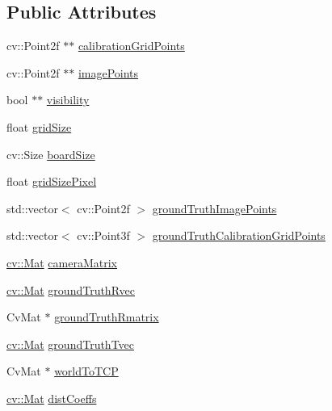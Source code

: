 \subsection*{Public Attributes}
\begin{DoxyCompactItemize}
\item 
cv\+::\+Point2f $\ast$$\ast$ \hyperlink{classsvl_c_c_calibration_grid_a16c87e7174d1ebadad02bb2f00374f20}{calibration\+Grid\+Points}
\item 
cv\+::\+Point2f $\ast$$\ast$ \hyperlink{classsvl_c_c_calibration_grid_af7379a6c73a59f86c73d299137455ac5}{image\+Points}
\item 
bool $\ast$$\ast$ \hyperlink{classsvl_c_c_calibration_grid_a7022b0856e07b5004a767fdd80d78e4a}{visibility}
\item 
float \hyperlink{classsvl_c_c_calibration_grid_ab80850211d593053f9742680204ad68d}{grid\+Size}
\item 
cv\+::\+Size \hyperlink{classsvl_c_c_calibration_grid_a0c584283648c8d63a0c33646d35a60f2}{board\+Size}
\item 
float \hyperlink{classsvl_c_c_calibration_grid_a6bc5a200e85665be8811614a3abe470b}{grid\+Size\+Pixel}
\item 
std\+::vector$<$ cv\+::\+Point2f $>$ \hyperlink{classsvl_c_c_calibration_grid_a1956cef695c8327984c5ba89b20b562b}{ground\+Truth\+Image\+Points}
\item 
std\+::vector$<$ cv\+::\+Point3f $>$ \hyperlink{classsvl_c_c_calibration_grid_a999d324f40227be7e33c7549f217bced}{ground\+Truth\+Calibration\+Grid\+Points}
\item 
\hyperlink{namespacecv_a60d81b54f4914bec4cc4a72ab77eb444}{cv\+::\+Mat} \hyperlink{classsvl_c_c_calibration_grid_a7a2116179fd17b6225c5fbeab19d99a0}{camera\+Matrix}
\item 
\hyperlink{namespacecv_a60d81b54f4914bec4cc4a72ab77eb444}{cv\+::\+Mat} \hyperlink{classsvl_c_c_calibration_grid_aa4eae79ebad278af9e217a647af596d9}{ground\+Truth\+Rvec}
\item 
Cv\+Mat $\ast$ \hyperlink{classsvl_c_c_calibration_grid_afce9a2410faf4d8bcd8a44fa7e6aab22}{ground\+Truth\+Rmatrix}
\item 
\hyperlink{namespacecv_a60d81b54f4914bec4cc4a72ab77eb444}{cv\+::\+Mat} \hyperlink{classsvl_c_c_calibration_grid_a76d4c8a5a30be5afc085db95aeae4505}{ground\+Truth\+Tvec}
\item 
Cv\+Mat $\ast$ \hyperlink{classsvl_c_c_calibration_grid_a76795dc4a6916d8c4cc6c2eec54bf049}{world\+To\+T\+C\+P}
\item 
\hyperlink{namespacecv_a60d81b54f4914bec4cc4a72ab77eb444}{cv\+::\+Mat} \hyperlink{classsvl_c_c_calibration_grid_a24635710953d9ad967caed593db745cf}{dist\+Coeffs}
$$
\end{DoxyCompactItemize}

